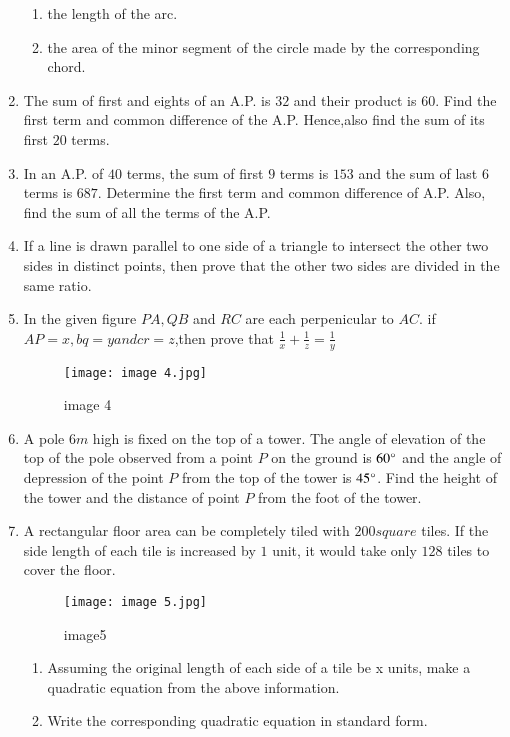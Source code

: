 \documentclass[12pt,-letter paper]{article}
\begin{document}
\begin{enumerate}
\begin{enumerate}
\item the length of the arc.
\item the area of the minor segment of the circle made by the corresponding chord.
\end{enumerate}
\item  The sum of first and eights of an A.P. is $32$ and their product is $60$. Find the first term  and common difference of the A.P. Hence,also find the sum of its first $20$ terms.
\item In an A.P. of $40$ terms, the sum of first $9$ terms is $153$ and the sum of last $6$ terms is $687$. Determine the first term and common difference of A.P. Also, find the sum of all the terms of the A.P.
\item If a line is drawn parallel to one side of a triangle to intersect the other two sides in distinct points, then prove that the other two sides are divided in the same ratio.
\item In the given figure $PA,QB$ and $RC$ are each perpenicular to $AC$. if $AP = x,bq=y and cr =z$,then prove that $\frac{1}{x} + \frac{1}{z} = \frac{1}{y}$                                               
\begin{figure}[!ht]
\centering
\texttt{[image: image 4.jpg]}
\label{fig:image 4}
\caption{image 4}
\end{figure}
\newpage
\item A pole $6m$ high is fixed on the top of a tower. The angle of elevation of the top of the pole observed from a point $P$ on the ground is $60\degree$ and the angle of depression of the point $P$ from the top of the tower is $45\degree$. Find the height of the tower and the distance of point $P$ from the foot of the tower.
\newpage
\item A rectangular floor area can be completely tiled with $200square$ tiles. If the side length of each tile is increased by $1$ unit, it would take only $128$ tiles to cover the floor.
\begin{figure}[!ht]
\centering
\texttt{[image: image 5.jpg]}
\label{fig:image5}
\caption{image5} 
\end{figure}
\begin{enumerate}
\item Assuming the original length of each side of a tile be x units, make a quadratic equation from the above information.\\
\item Write the corresponding quadratic equation in standard form.\\

\end{enumerate}
\end{enumerate}
\end{document}
